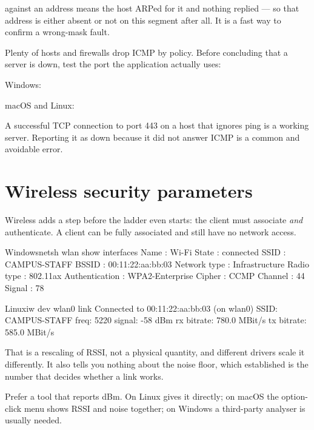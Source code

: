 against an address means the host ARPed for it and nothing replied
--- so that address is either absent or not on this segment after all. It is a
fast way to confirm a wrong-mask fault.

\begin{alertbox}
Plenty of hosts and firewalls drop ICMP by policy. Before concluding that a
server is down, test the port the application actually uses:

\begin{tight}
  \item Windows: 
  \item macOS and Linux: 
\end{tight}

A successful TCP connection to port 443 on a host that ignores ping is a working
server. Reporting it as down because it did not answer ICMP is a common and
avoidable error.
\end{alertbox}

\section{Wireless security parameters}

Wireless adds a step before the ladder even starts: the client must associate
\emph{and} authenticate. A client can be fully associated and still have no
network access.

\begin{hostcmd}{Windows}{netsh wlan show interfaces}
    Name                   : Wi-Fi
    State                  : connected
    SSID                   : CAMPUS-STAFF
    BSSID                  : 00:11:22:aa:bb:03
    Network type           : Infrastructure
    Radio type             : 802.11ax
    Authentication         : WPA2-Enterprise
    Cipher                 : CCMP
    Channel                : 44
    Signal                 : 78%
\end{hostcmd}

\begin{hostcmd}{Linux}{iw dev wlan0 link}
Connected to 00:11:22:aa:bb:03 (on wlan0)
        SSID: CAMPUS-STAFF
        freq: 5220
        signal: -58 dBm
        rx bitrate: 780.0 MBit/s
        tx bitrate: 585.0 MBit/s
\end{hostcmd}

\begin{conceptbox}
That  is a rescaling of RSSI, not a physical quantity, and
different drivers scale it differently. It also tells you nothing about the noise
floor, which  established is the number that decides whether a
link works.

Prefer a tool that reports dBm. On Linux  gives it directly; on macOS the
option-click menu shows RSSI and noise together; on Windows a third-party
analyser is usually needed.
\end{conceptbox}

